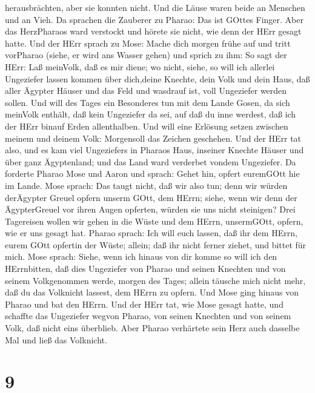 herausbrächten, aber sie konnten nicht. Und die Läuse waren beide an
Menschen und an Vieh.  Da sprachen die Zauberer zu Pharao:
Das ist GOttes Finger. Aber das HerzPharaos ward verstockt und hörete
sie nicht, wie denn der HErr gesagt hatte.  Und der HErr
sprach zu Mose: Mache dich morgen frühe auf und tritt vorPharao (siehe,
er wird ans Wasser gehen) und sprich zu ihm: So sagt der HErr: Laß
meinVolk, daß es mir diene;  wo nicht, siehe, so will ich
allerlei Ungeziefer lassen kommen über dich,deine Knechte, dein Volk und
dein Haus, daß aller Ägypter Häuser und das Feld und wasdrauf ist, voll
Ungeziefer werden sollen.  Und will des Tages ein
Besonderes tun mit dem Lande Gosen, da sich meinVolk enthält, daß kein
Ungeziefer da sei, auf daß du inne werdest, daß ich der HErr binauf
Erden allenthalben.  Und will eine Erlösung setzen zwischen
meinem und deinem Volk: Morgensoll das Zeichen geschehen. 
Und der HErr tat also, und es kam viel Ungeziefers in Pharaos Haus,
inseiner Knechte Häuser und über ganz Ägyptenland; und das Land ward
verderbet vondem Ungeziefer.  Da forderte Pharao Mose und
Aaron und sprach: Gehet hin, opfert euremGOtt hie im Lande.
 Mose sprach: Das taugt nicht, daß wir also tun; denn wir
würden derÄgypter Greuel opfern unserm GOtt, dem HErrn; siehe, wenn wir
denn der ÄgypterGreuel vor ihren Augen opferten, würden sie uns nicht
steinigen?  Drei Tagereisen wollen wir gehen in die Wüste
und dem HErrn, unsermGOtt, opfern, wie er uns gesagt hat. 
Pharao sprach: Ich will euch lassen, daß ihr dem HErrn, eurem GOtt
opfertin der Wüste; allein; daß ihr nicht ferner ziehet, und bittet für
mich.  Mose sprach: Siehe, wenn ich hinaus von dir komme so
will ich den HErrnbitten, daß dies Ungeziefer von Pharao und seinen
Knechten und von seinem Volkgenommen werde, morgen des Tages; allein
täusche mich nicht mehr, daß du das Volknicht lassest, dem HErrn zu
opfern.  Und Mose ging hinaus von Pharao und bat den HErrn.
 Und der HErr tat, wie Mose gesagt hatte, und schaffte das
Ungeziefer wegvon Pharao, von seinen Knechten und von seinem Volk, daß
nicht eins überblieb.  Aber Pharao verhärtete sein Herz
auch dasselbe Mal und ließ das Volknicht.

\hypertarget{section-8}{%
\section{9}\label{section-8}}

